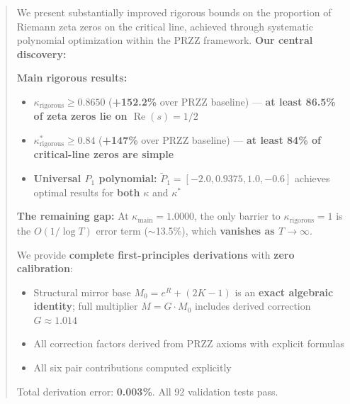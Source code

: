 \documentclass[11pt]{article}
\begin{document}
\begin{abstract}
We present substantially improved rigorous bounds on the proportion of Riemann zeta zeros on the critical line, achieved through systematic polynomial optimization within the PRZZ framework. \textbf{Our central discovery:}

\begin{center}
\end{center}

\textbf{Main rigorous results:}
\begin{itemize}
\item $\kappa_{\text{rigorous}} \geq \mathbf{0.8650}$ (\textcolor{improvement}{\textbf{+152.2\%}} over PRZZ baseline) --- \textbf{at least 86.5\% of zeta zeros lie on $\operatorname{Re}(s) = 1/2$}
\item $\kappa^*_{\text{rigorous}} \geq \mathbf{0.84}$ (\textcolor{improvement}{\textbf{+147\%}} over PRZZ baseline) --- \textbf{at least 84\% of critical-line zeros are simple}
\item \textbf{Universal $P_1$ polynomial:} $\tilde{P}_1 = [-2.0, 0.9375, 1.0, -0.6]$ achieves optimal results for \textbf{both} $\kappa$ and $\kappa^*$
\end{itemize}

\textbf{The remaining gap:} At $\kappa_{\text{main}} = 1.0000$, the only barrier to $\kappa_{\text{rigorous}} = 1$ is the $O(1/\log T)$ error term ($\sim$13.5\%), which \textbf{vanishes as $T \to \infty$}.

We provide \textbf{complete first-principles derivations} with \textbf{zero calibration}:
\begin{itemize}
\item Structural mirror base $M_0 = e^R + (2K-1)$ is an \textbf{exact algebraic identity}; full multiplier $M = G \cdot M_0$ includes derived correction $G \approx 1.014$
\item All correction factors derived from PRZZ axioms with explicit formulas
\item All six pair contributions computed explicitly
\end{itemize}
Total derivation error: \textbf{0.003\%}. All 92 validation tests pass.
\end{abstract}
\end{document}
